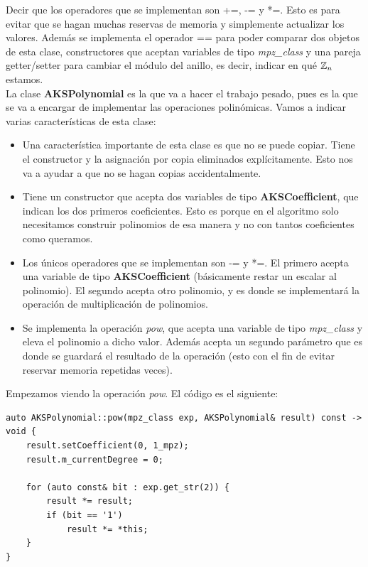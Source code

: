 Decir que los operadores que se implementan son +=, -= y *=. Esto es para evitar que se hagan muchas reservas de memoria y simplemente actualizar los valores. Además se implementa el operador == para poder comparar dos objetos de esta clase, constructores que aceptan variables de tipo \textit{mpz\_class} y una pareja getter/setter para cambiar el módulo del anillo, es decir, indicar en qué $\mathbb{Z}_n$ estamos.\\

La clase \textbf{AKSPolynomial} es la que va a hacer el trabajo pesado, pues es la que se va a encargar de implementar las operaciones polinómicas. Vamos a indicar varias características de esta clase:

\begin{itemize}
	\item Una característica importante de esta clase es que no se puede copiar. Tiene el constructor y la asignación por copia eliminados explícitamente. Esto nos va a ayudar a que no se hagan copias accidentalmente.
	
	\item Tiene un constructor que acepta dos variables de tipo \textbf{AKSCoefficient}, que indican los dos primeros coeficientes. Esto es porque en el algoritmo solo necesitamos construir polinomios de esa manera y no con tantos coeficientes como queramos.
	
	\item Los únicos operadores que se implementan son -= y *=. El primero acepta una variable de tipo \textbf{AKSCoefficient} (básicamente restar un escalar al polinomio). El segundo acepta otro polinomio, y es donde se implementará la operación de multiplicación de polinomios.
	
	\item Se implementa la operación \textit{pow}, que acepta una variable de tipo \textit{mpz\_class} y eleva el polinomio a dicho valor. Además acepta un segundo parámetro que es donde se guardará el resultado de la operación (esto con el fin de evitar reservar memoria repetidas veces).
\end{itemize}

Empezamos viendo la operación \textit{pow}. El código es el siguiente:\\

\begin{lstlisting}
auto AKSPolynomial::pow(mpz_class exp, AKSPolynomial& result) const -> void {
	result.setCoefficient(0, 1_mpz);
	result.m_currentDegree = 0;
	
	for (auto const& bit : exp.get_str(2)) {
		result *= result;
		if (bit == '1')
			result *= *this;
	}
}
\end{lstlisting}

